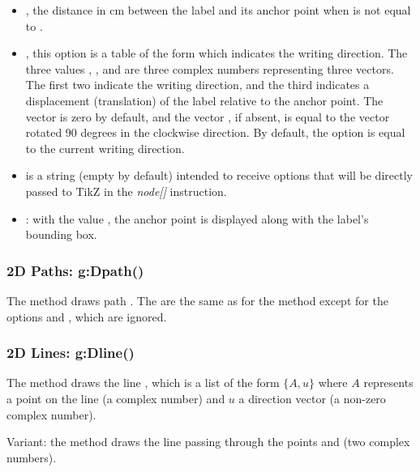 \begin{itemize}
\begin{itemize}
    \item {}, the distance in cm between the label and its anchor point when  is not equal to .

    \item {}, this option is a table of the form  which indicates the writing direction. The three values ​​, , and  are three complex numbers representing three vectors. The first two indicate the writing direction, and the third indicates a displacement (translation) of the label relative to the anchor point. The vector  is zero by default, and the vector , if absent, is equal to the vector  rotated 90 degrees in the clockwise direction. By default, the  option is equal to the current writing direction.

    \item {} is a string (empty by default) intended to receive options that will be directly passed to TikZ in the \emph{node[]} instruction.

    \item {}: with the value \true, the anchor point is displayed along with the label's bounding box.
    \end{itemize}
\end{itemize}


\subsubsection{2D Paths: g:Dpath()}

The method  draws path . The  are the same as for the method  except for the options  and , which are ignored.

\subsubsection{2D Lines: g:Dline()}

The method  draws the line , which is a list of the form $\{A,u\}$ where $A$ represents a point on the line (a complex number) and $u$ a direction vector (a non-zero complex number).

Variant: the method  draws the line passing through the points  and  (two complex numbers).

